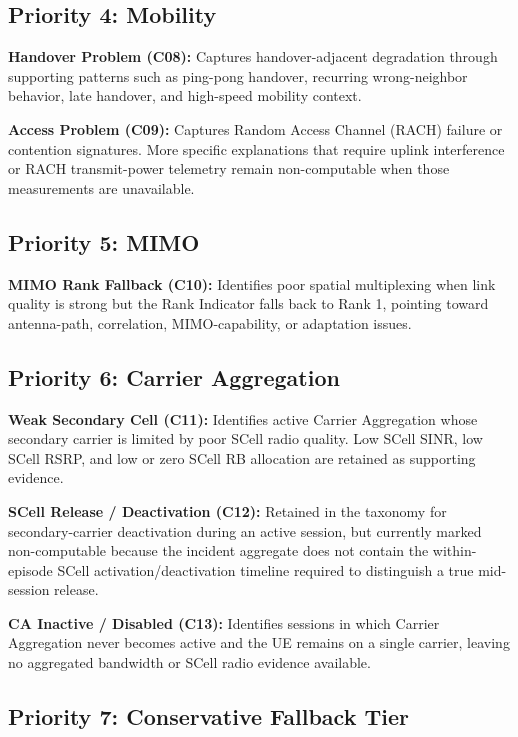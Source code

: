 \subsection{Priority 4: Mobility}

\textbf{Handover Problem (C08):} Captures handover-adjacent degradation through supporting patterns such as ping-pong handover, recurring wrong-neighbor behavior, late handover, and high-speed mobility context.

\textbf{Access Problem (C09):} Captures Random Access Channel (RACH) failure or contention signatures. More specific explanations that require uplink interference or RACH transmit-power telemetry remain non-computable when those measurements are unavailable.

\subsection{Priority 5: MIMO}

\textbf{MIMO Rank Fallback (C10):} Identifies poor spatial multiplexing when link quality is strong but the Rank Indicator falls back to Rank 1, pointing toward antenna-path, correlation, MIMO-capability, or adaptation issues.

\subsection{Priority 6: Carrier Aggregation}

\textbf{Weak Secondary Cell (C11):} Identifies active Carrier Aggregation whose secondary carrier is limited by poor SCell radio quality. Low SCell SINR, low SCell RSRP, and low or zero SCell RB allocation are retained as supporting evidence.

\textbf{SCell Release / Deactivation (C12):} Retained in the taxonomy for secondary-carrier deactivation during an active session, but currently marked non-computable because the incident aggregate does not contain the within-episode SCell activation/deactivation timeline required to distinguish a true mid-session release.

\textbf{CA Inactive / Disabled (C13):} Identifies sessions in which Carrier Aggregation never becomes active and the UE remains on a single carrier, leaving no aggregated bandwidth or SCell radio evidence available.

\subsection{Priority 7: Conservative Fallback Tier}

